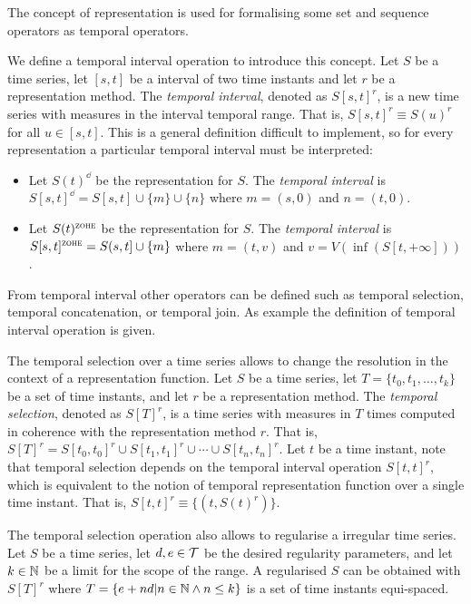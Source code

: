 The concept of representation is used for formalising some set and
sequence operators as temporal operators. 



We define a temporal interval operation to introduce this concept.
Let $S$ be a time series, let $[s,t]$ be a interval of two time instants
and let $r$ be a representation method. The \emph{temporal interval}, denoted
as $S[s,t]^r$, is a new time series with measures in the interval
temporal range. That is, $S[s,t]^r\equiv S(u)^r$ for all $u \in [s,t]$. This
is a general definition difficult to implement, so for every
representation a particular temporal interval must be interpreted:

\begin{itemize}
\item Let $S(t)^\dd$ be the \dd{} representation for $S$. The
  \emph{\dd{} temporal interval} is $S[s,t]^\dd = S[s,t]
  \cup \{m\} \cup \{n\}$ where $m=(s,0)$ and $n=(t,0)$.

\item Let $S(t)^\zohe{}$ be the \zohe{} representation for $S$. The
  \emph{\zohe{} temporal interval} is $S[s,t]^\zohe{} = S(s,t]
  \cup \{m\}$ where $m=(t,v)$ and $v= V(\inf( S[t,+\infty] ))$.
\end{itemize}



From temporal interval other operators can be defined such as temporal
selection, temporal concatenation, or temporal join. As example the
definition of temporal interval operation is given.


The temporal selection over a time series allows to change the
resolution in the context of a representation function.  Let $S$ be a
time series, let $T=\{t_0,t_1,\dotsc,t_k\}$ be a set of time instants, and let 
$r$ be a representation method. The \emph{temporal selection}, denoted as
$S[T]^r$, is a time series with measures in $T$ times computed in
coherence with the representation method $r$. That is, $S[T]^r = S[t_0,t_0]^r
\cup S[t_1,t_1]^r \cup \dotsb \cup S[t_n,t_n]^r$. Let $t$ be a time
instant, note that temporal selection depends on the temporal interval
operation $S[t,t]^r$, which is equivalent to the notion of
temporal representation function over a single time instant. That is, $S[t,t]^r
\equiv \{ (t, S(t)^r) \}$.




The temporal selection operation also allows to regularise a irregular
time series. Let $S$ be a time series, let $d,e\in\cal{T}$ be the
desired regularity parameters, and let $k\in\mathbb{N}$ be a limit for the
scope of the range.  A regularised $S$ can be obtained with $S[T]^r$
where $T = \{e+nd | n\in\mathbb{N} \wedge n\leq k \}$ is a set of time
instants equi-spaced.





